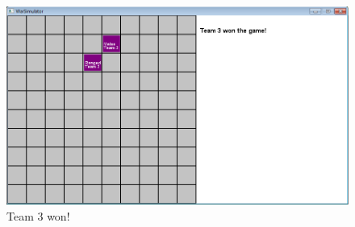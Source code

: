 		\begin{figure}[H]
		\center
			\includegraphics[scale=0.6]{rapport/7/figures/case2-3.png}
			\caption{Team 3 won!}
		\end{figure}
	
